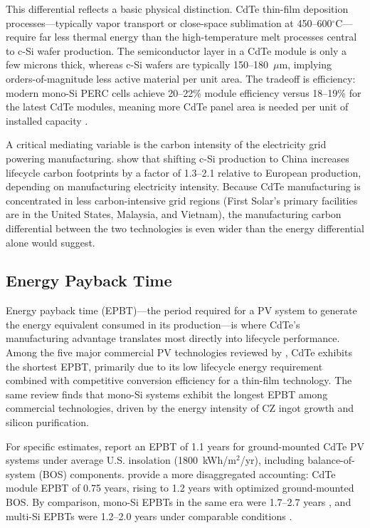 \documentclass{article}
\begin{document}
This differential reflects a basic physical distinction. CdTe thin-film deposition processes---typically vapor transport or close-space sublimation at 450--600$^\circ$C---require far less thermal energy than the high-temperature melt processes central to c-Si wafer production. The semiconductor layer in a CdTe module is only a few microns thick, whereas c-Si wafers are typically 150--180~$\mu$m, implying orders-of-magnitude less active material per unit area. The tradeoff is efficiency: modern mono-Si PERC cells achieve 20--22\% module efficiency versus 18--19\% for the latest CdTe modules, meaning more CdTe panel area is needed per unit of installed capacity \citep{smith2024nrel}.
 
A critical mediating variable is the carbon intensity of the electricity grid powering manufacturing. \citet{dewild2013} show that shifting c-Si production to China increases lifecycle carbon footprints by a factor of 1.3--2.1 relative to European production, depending on manufacturing electricity intensity. Because CdTe manufacturing is concentrated in less carbon-intensive grid regions (First Solar's primary facilities are in the United States, Malaysia, and Vietnam), the manufacturing carbon differential between the two technologies is even wider than the energy differential alone would suggest.
 
\subsection{Energy Payback Time}
 
Energy payback time (EPBT)---the period required for a PV system to generate the energy equivalent consumed in its production---is where CdTe's manufacturing advantage translates most directly into lifecycle performance. Among the five major commercial PV technologies reviewed by \citet{peng2013}, CdTe exhibits the shortest EPBT, primarily due to its low lifecycle energy requirement combined with competitive conversion efficiency for a thin-film technology. The same review finds that mono-Si systems exhibit the longest EPBT among commercial technologies, driven by the energy intensity of CZ ingot growth and silicon purification.
 
For specific estimates, \citet{fthenakiskim2011} report an EPBT of 1.1 years for ground-mounted CdTe PV systems under average U.S. insolation (1800~kWh/m$^2$/yr), including balance-of-system (BOS) components. \citet{fthenakiskim2005} provide a more disaggregated accounting: CdTe module EPBT of 0.75 years, rising to 1.2 years with optimized ground-mounted BOS. By comparison, mono-Si EPBTs in the same era were 1.7--2.7 years \citep{peng2013}, and multi-Si EPBTs were 1.2--2.0 years under comparable conditions \citep{fthenakiskim2011}.
 
\end{document}
